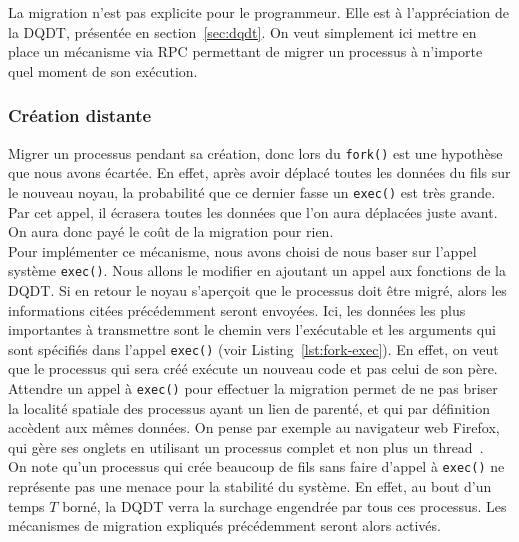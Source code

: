        La migration n'est pas explicite pour le programmeur. Elle est à
        l'appréciation de la DQDT, présentée en section~\ref{sec:dqdt}. On veut
        simplement ici mettre en place un mécanisme via RPC permettant de migrer
        un processus à n'importe quel moment de son exécution.

      \subsubsection{Création distante}

        Migrer un processus pendant sa création, donc lors du \texttt{fork()}
        est une hypothèse que nous avons écartée. En effet, après avoir déplacé
        toutes les données du fils sur le nouveau noyau, la probabilité que ce
        dernier fasse un \texttt{exec()} est très grande. Par cet appel, il
        écrasera toutes les données que l'on aura déplacées juste avant. On aura
        donc payé le coût de la migration pour rien.\\

        Pour implémenter ce mécanisme, nous avons choisi de nous baser sur
        l'appel système \texttt{exec()}. Nous allons le modifier en ajoutant un
        appel aux fonctions de la DQDT. Si en retour le noyau s'aperçoit que le
        processus doit être migré, alors les informations citées précédemment
        seront envoyées. Ici, les données les plus importantes à transmettre
        sont le chemin vers l'exécutable et les arguments qui sont spécifiés
        dans l'appel \texttt{exec()} (voir Listing~\ref{lst:fork-exec}). En
        effet, on veut que le processus qui sera créé exécute un nouveau code et
        pas celui de son père.\\

        Attendre un appel à \texttt{exec()} pour effectuer la migration permet
        de ne pas briser la localité spatiale des processus ayant un lien de
        parenté, et qui par définition accèdent aux mêmes données. On pense par
        exemple au navigateur web Firefox, qui gère ses onglets en utilisant un
        processus complet et non plus un thread~\citep{mozillaElectrolysis}.\\

        On note qu'un processus qui crée beaucoup de fils sans faire d'appel à
        \texttt{exec()} ne représente pas une menace pour la stabilité du
        système. En effet, au bout d'un temps $T$ borné, la DQDT verra la
        surchage engendrée par tous ces processus. Les mécanismes de migration
        expliqués précédemment seront alors activés.


